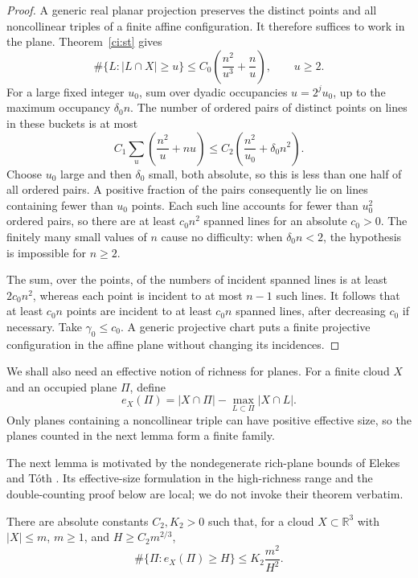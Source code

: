 \begin{proof}
A generic real planar projection preserves the distinct points and
all noncollinear triples of a finite affine configuration.  It
therefore suffices to work in the plane.  Theorem~\ref{ci:st} gives
\begin{equation}
\label{mot:st-rich}
 \#\{L:|L\cap X|\ge u\}
 \le C_0\left(\frac{n^2}{u^3}+\frac nu\right),
 \qquad u\ge2.
\end{equation}
For a large fixed integer \(u_0\), sum over dyadic occupancies
\(u=2^j u_0\), up to the maximum occupancy \(\delta_0 n\).
The number of ordered pairs of distinct points on lines in these
buckets is at most
\[
 C_1\sum_{u}
 \left(\frac{n^2}{u}+nu\right)
 \le C_2\left(\frac{n^2}{u_0}+\delta_0 n^2\right).
\]
Choose \(u_0\) large and then \(\delta_0\) small, both absolute,
so this is less than one half of all ordered pairs.  A positive
fraction of the pairs consequently lie on lines containing fewer
than \(u_0\) points.  Each such line accounts for fewer than
\(u_0^2\) ordered pairs, so there are at least \(c_0n^2\) spanned
lines for an absolute \(c_0>0\).  The finitely many small values of
\(n\) cause no difficulty: when \(\delta_0n<2\), the hypothesis
is impossible for \(n\ge2\).

The sum, over the points, of the numbers of incident spanned lines
is at least \(2c_0n^2\), whereas each point is incident to at most
\(n-1\) such lines.  It follows that at least \(c_0n\) points
are incident to at least \(c_0n\) spanned lines, after decreasing
\(c_0\) if necessary.  Take \(\gamma_0\le c_0\).
A generic projective chart puts a finite projective configuration
in the affine plane without changing its incidences.
\end{proof}

We shall also need an effective notion of richness for planes.
For a finite cloud \(X\) and an occupied plane \(\Pi\), define
\[
 e_X(\Pi)
 =|X\cap\Pi|-\max_{L\subset\Pi}|X\cap L|.
\]
Only planes containing a noncollinear triple can have positive
effective size, so the planes counted in the next lemma form a
finite family.

The next lemma is motivated by the nondegenerate rich-plane bounds of
Elekes and T\'oth \cite{elekestoth2005}.  Its effective-size formulation
in the high-richness range and the double-counting proof below are local;
we do not invoke their theorem verbatim.

\begin{lemma}
\label{mot:effective-planes}
There are absolute constants \(C_2,K_2>0\) such that, for a cloud
\(X\subset\mathbb R^3\) with \(|X|\le m\), \(m\ge1\), and
\(H\ge C_2m^{2/3}\),
\[
 \#\{\Pi:e_X(\Pi)\ge H\}\le K_2\frac{m^2}{H^2}.
\]
\end{lemma}


